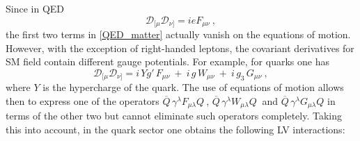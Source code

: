 \documentclass[12pt,preprintnumbers,nofootinbib]{revtex4}
\newcommand{\ov}{\overline}
\begin{document}
	Since in QED
\begin{equation}
\label{Fmn}
	\mathcal{D}_{[\mu}\mathcal{D}_{\nu]} = i e F_{\mu\nu}~, 
\end{equation} 
	the first two terms in \eqref{QED_matter} actually vanish on 
	the equations of motion.
	However, with the exception of right-handed leptons, 
	the covariant derivatives for SM field contain different gauge potentials. 
	For example, for quarks one has
\begin{equation}
\label{FmnQCD}
	\mathcal{D}_{[\mu}\mathcal{D}_{\nu]} = 
	i\, Y g'\, F_{\mu\nu} ~+~ 
	i\, g\, W_{\mu\nu} ~+~
	i\, g_3\, G_{\mu\nu}~,
\end{equation}
	where $ Y $ is the hypercharge of the quark.
	The use of equations of motion allows then to express one of the operators 
$ \ov{Q}\, \gamma^\lambda F_{\mu\lambda} Q~ $,
$ \ov{Q}\, \gamma^\lambda W_{\mu\lambda} Q~ $ and
$ \ov{Q}\, \gamma^\lambda G_{\mu\lambda} Q $
	in terms of the other two but cannot eliminate such operators completely.
	Taking this into account, 
	in the quark sector 
	one obtains the following LV interactions:
\end{document}
